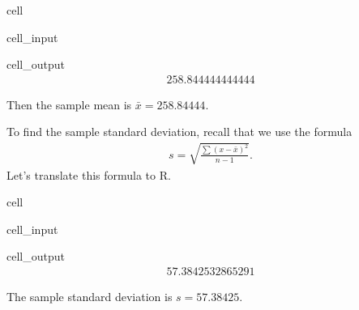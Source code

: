 \documentclass[letterpaper,10pt,english]{jupyterBook}
\begin{document}
\begin{sphinxuseclass}{cell}
\begin{sphinxVerbatimInput}
\begin{sphinxuseclass}{cell_input}
\end{sphinxuseclass}\end{sphinxVerbatimInput}
\begin{sphinxVerbatimOutput}

\begin{sphinxuseclass}{cell_output}\begin{equation*}
\begin{split}258.844444444444\end{split}
\end{equation*}
\end{sphinxuseclass}\end{sphinxVerbatimOutput}

\end{sphinxuseclass}
\sphinxAtStartPar
Then the sample mean is \(\bar{x} = 258.84444\).

\sphinxAtStartPar
To find the sample standard deviation, recall that we use the formula
\begin{equation*}
\begin{split} s = \sqrt{\frac{\sum (x - \bar{x})^2}{n - 1}}. \end{split}
\end{equation*}
\sphinxAtStartPar
Let’s translate this formula to R.

\begin{sphinxuseclass}{cell}\begin{sphinxVerbatimInput}

\begin{sphinxuseclass}{cell_input}
\begin{sphinxVerbatim}[commandchars=\\\{\}]
\end{sphinxVerbatim}

\end{sphinxuseclass}\end{sphinxVerbatimInput}
\begin{sphinxVerbatimOutput}

\begin{sphinxuseclass}{cell_output}\begin{equation*}
\begin{split}57.3842532865291\end{split}
\end{equation*}
\end{sphinxuseclass}\end{sphinxVerbatimOutput}

\end{sphinxuseclass}
\sphinxAtStartPar
The sample standard deviation is \(s = 57.38425\).
\end{document}
